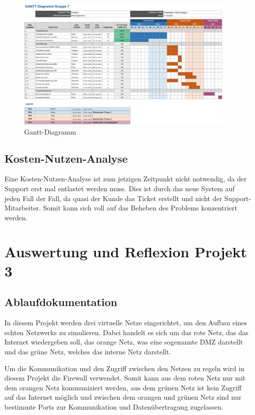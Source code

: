 \documentclass[a4paper,
    11pt,
    headings=small,
    ngerman,
    listof=totoc,
    numbers=noenddot]{scrreprt}[2021/11/13]
\begin{document}
\begin{figure}[htbp]
  \centering
  \includegraphics[width=0.95\textwidth]{data/Gantt.png}
  \caption{Gantt-Diagramm}
  \label{fig:GanttKlein}
\end{figure}



\section{Kosten-Nutzen-Analyse}

Eine Kosten-Nutzen-Analyse ist zum jetzigen Zeitpunkt nicht notwendig, da der Support erst mal entlastet werden muss. Dies ist durch das neue System auf jeden Fall der Fall, da quasi der Kunde das Ticket erstellt und nicht der Support-Mitarbeiter. Somit kann sich voll auf das Beheben des Problems konzentriert werden.




\chapter{Auswertung und Reflexion Projekt 3}



\section{Ablaufdokumentation}

In diesem Projekt werden drei virtuelle Netze eingerichtet, um den Aufbau eines echten Netzwerks zu simulieren. Dabei handelt es sich um das rote Netz, das das Internet wiedergeben soll, das orange Netz, was eine sogenannte \ac{DMZ} darstellt und das grüne Netz, welches das interne Netz darstellt.

Um die Kommunikation und den Zugriff zwischen den Netzen zu regeln wird in diesem Projekt die Firewall verwendet. Somit kann aus dem roten Netz nur mit dem orangen Netz kommuniziert werden, aus dem grünen Netz ist kein Zugriff auf das Internet möglich und zwischen dem orangen und grünen Netz sind nur bestimmte Ports zur Kommunikation und Datenübertragung zugelassen.
\end{document}
